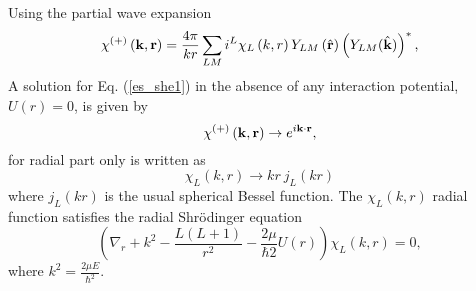 \documentclass[
11pt, %
english, %
onehalfspacing, %
headsepline, %
]{MastersDoctoralThesis} %
\begin{document}
Using the partial wave expansion 
\begin{equation}
\chi^{(+)} \left( {\bf k}, {\bf r} \right) = 
\frac{4 \pi}{kr} \sum_{LM} i^{L} \chi_L \left( k,r \right) 
Y_{LM}\left( \hat{{\bf r}}\right) \left( Y_{LM}( \hat{{\bf k}})\right)^{*},
\end{equation}
A solution for Eq. (\ref{es_she1}) in the absence of any interaction potential, $U \left( r \right) = 0$, is given by 
\begin{equation}
\chi^{(+)} \left( {\bf k}, {\bf r} \right) \rightarrow
e^{i {\bf k} \cdot {\bf r}},
\end{equation}
for radial part only is written as
\begin{equation}
\chi_L \left( k,r \right)  \rightarrow kr~j_L \left(kr \right)
\end{equation}
where $j_L \left(kr \right)$ is the usual spherical Bessel function. The $\chi_L \left( k,r \right)$ radial function satisfies the radial Shr\"{o}dinger equation
\begin{equation}
\left( \nabla_r + k^2 - \frac{L(L+1)}{r^2} - \frac{2 \mu}{\hbar2} U \left( r \right)\right) \chi_L \left( k,r \right) =0,
\label{es_she_radial}
\end{equation}
where $k^2 = \frac{2\mu E}{\hbar^2}$.
\end{document}
